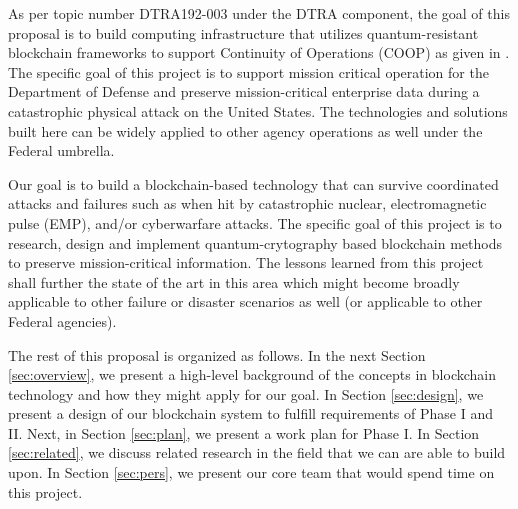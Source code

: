 As per topic number DTRA192-003 under the DTRA component, the goal of this proposal is to build computing infrastructure
that utilizes quantum-resistant blockchain frameworks to support Continuity of Operations (COOP) as given in
\cite{whitworth2006}. The specific goal of this project is to support mission critical operation for the Department of
Defense and preserve mission-critical enterprise data during a catastrophic physical attack on the United States. The
technologies and solutions built here can be widely applied to other agency operations as well under the Federal
umbrella. 

Our goal is to build a blockchain-based technology that can survive coordinated attacks and failures such as when
hit by catastrophic nuclear, electromagnetic pulse (EMP), and/or cyberwarfare attacks. The specific goal of this project
is to research, design and implement quantum-crytography based blockchain methods to preserve mission-critical
information. The lessons learned from this project shall further the state of the art in this area which might become
broadly applicable to other failure or disaster scenarios as well (or applicable to other Federal agencies).

The rest of this proposal is organized as follows. In the next Section \ref{sec:overview}, we present a high-level
background of the concepts in blockchain technology and how they might apply for our goal. In Section \ref{sec:design},
we present a design of our blockchain system to fulfill requirements of Phase I and II. Next, in Section \ref{sec:plan},
we present a work plan for Phase I. In Section \ref{sec:related}, we discuss related research in the field that we can
are able to build upon. In Section \ref{sec:pers}, we present our core team that would spend time on this project.

